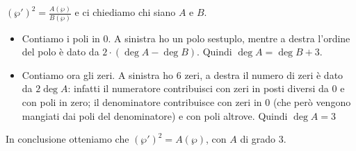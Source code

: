 $(\wp')^2=\frac{A(\wp)}{B(\wp)}$ e ci chiediamo chi siano $A$ e $B$.

\begin{itemize}
 \item Contiamo i poli in 0. A sinistra ho un polo sestuplo, mentre a destra l'ordine del polo è dato da $2\cdot (\deg A - \deg B)$. Quindi $\deg A = \deg B + 3$.
 \item Contiamo ora gli zeri. A sinistra ho 6 zeri, a destra il numero di zeri è dato da $2 \deg A$: infatti il numeratore contribuisci con zeri in posti diversi da 0 e con poli in zero; il denominatore contribuisce con zeri in 0 (che però vengono mangiati dai poli del denominatore) e con poli altrove. Quindi $\deg A = 3$
\end{itemize}

In conclusione otteniamo che $(\wp')^2=A(\wp)$, con $A$ di grado 3.
